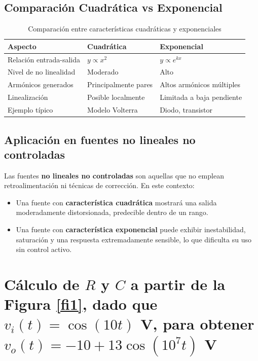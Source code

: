 \subsection{Comparación Cuadrática vs Exponencial}

\begin{table}[h]
\centering
\begin{tabular}{|l|l|l|}
\hline
\textbf{Aspecto} & \textbf{Cuadrática} & \textbf{Exponencial} \\
\hline
Relación entrada-salida & $y \propto x^2$ & $y \propto e^{kx}$ \\
Nivel de no linealidad & Moderado & Alto \\
Armónicos generados & Principalmente pares & Altos armónicos múltiples \\
Linealización & Posible localmente & Limitada a baja pendiente \\
Ejemplo típico & Modelo Volterra & Diodo, transistor \\
\hline
\end{tabular}
\caption{Comparación entre características cuadráticas y exponenciales}
\end{table}

\subsection{Aplicación en fuentes no lineales no controladas}

Las fuentes \textbf{no lineales no controladas} son aquellas que no emplean retroalimentación ni técnicas de corrección. En este contexto:

\begin{itemize}
    \item Una fuente con \textbf{característica cuadrática} mostrará una salida moderadamente distorsionada, predecible dentro de un rango.
    \item Una fuente con \textbf{característica exponencial} puede exhibir inestabilidad, saturación y una respuesta extremadamente sensible, lo que dificulta su uso sin control activo.
\end{itemize}


\section{Cálculo de $R$ y $C$ a partir de la Figura \ref{fi1}, dado que $v_i(t) = \cos(10t)$ V, para obtener $v_o(t) = -10 + 13 \cos(10^7 t)$ V}


